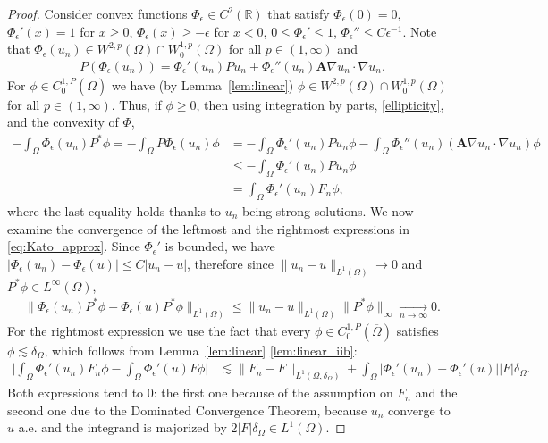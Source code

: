 \documentclass[12pt,a4paper]{amsart}
\theoremstyle{definition}
\newcommand{\R}{\mathbb{R}}
\newcommand{\A}{\mathbf{A}}
\begin{document}
\begin{proof}
    Consider convex functions $\Phi_\epsilon \in C^2(\R)$ that satisfy $\Phi_\epsilon(0) = 0$, $\Phi_\epsilon'(x) = 1$ for $x\geq 0$, $\Phi_\epsilon(x) \geq -\epsilon$ for $x<0$, $0\leq \Phi_\epsilon'\leq 1$, $\Phi_\epsilon'' \leq C\epsilon^{-1}$. Note that $\Phi_\epsilon(u_n)\in W^{2,p}(\Omega)\cap W^{1,p}_0(\Omega)$ for all $p\in (1,\infty)$ and
    \begin{align*}
        P ( \Phi_\epsilon(u_n) ) = \Phi_\epsilon'(u_n) Pu_n + \Phi_\epsilon''(u_n) \A \nabla u_n  \cdot \nabla u_n.
    \end{align*}
    For $\phi \in C^{1,P}_0(\overline{\Omega})$ we have (by Lemma~\ref{lem:linear}) $\phi \in W^{2,p}(\Omega)\cap W^{1,p}_0(\Omega)$ for all $p\in (1,\infty)$. Thus, if $\phi\geq 0$, then using integration by parts, \eqref{ellipticity}, and the convexity of $\Phi$,
    \begin{equation} \label{eq:Kato_approx}
    \begin{split}
        -\int_\Omega \Phi_\epsilon(u_n) P^\ast \phi = -\int_\Omega P \Phi_\epsilon(u_n) \phi &= -\int_\Omega \Phi_\epsilon'(u_n) Pu_n\phi - \int_\Omega \Phi_\epsilon''(u_n) (\A \nabla u_n  \cdot \nabla u_n) \phi\\
        &\leq -\int_\Omega \Phi_\epsilon'(u_n) Pu_n\phi\\
        &= \int_\Omega  \Phi_\epsilon'(u_n) F_n\phi,
    \end{split}
    \end{equation}
    where the last equality holds thanks to $u_n$ being strong solutions. We now examine the convergence of the leftmost and the rightmost expressions in \eqref{eq:Kato_approx}. Since $\Phi_\epsilon'$ is bounded, we have $|\Phi_\epsilon(u_n) - \Phi_\epsilon(u)| \leq C|u_n-u|$, therefore since $\|u_n-u\|_{L^1(\Omega)}\to 0$ and $P^*\phi\in L^\infty(\Omega)$,
    \begin{align*}
        \|\Phi_\epsilon(u_n) P^\ast \phi - \Phi_\epsilon(u) P^\ast \phi\|_{L^1(\Omega)} \leq \|u_n-u\|_{L^1(\Omega)}\|P^* \phi\|_{\infty}\mathop{\longrightarrow}\limits_{n\to \infty} 0.
    \end{align*}
    For the rightmost expression we use the fact that every $\phi \in C^{1,P}_0(\overline{\Omega})$ satisfies $\phi\lesssim \delta_\Omega$, which follows from Lemma~\ref{lem:linear} \ref{lem:linear_iib}:  
    \begin{align*}
        \bigg|\int_\Omega  \Phi_\epsilon'(u_n) F_n\phi - \int_\Omega  \Phi_\epsilon'(u) F\phi\bigg| &\lesssim  \|F_n - F\|_{L^1(\Omega,\delta_\Omega)} +\int_\Omega |\Phi_\epsilon'(u_n)  -\Phi_\epsilon'(u)| |F|\delta_\Omega .
    \end{align*}
    Both expressions tend to 0: the first one because of the assumption on $F_n$ and the second one due to the Dominated Convergence Theorem, because $u_n$ converge to $u$ a.e. and the integrand is majorized by $2|F|\delta_\Omega\in L^1(\Omega)$. 


\end{proof}
\end{document}
